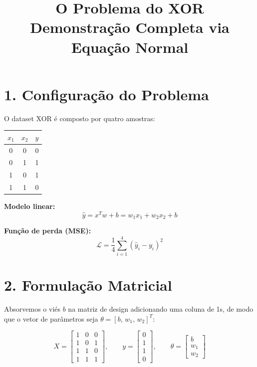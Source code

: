 \documentclass[12pt, a4paper]{article}
\title{
  \textbf{\textcolor{destaque}{O Problema do XOR}}\\[0.4em]
  \large Demonstração Completa via Equação Normal
}
\author{}
\date{}
\begin{document}
\maketitle
\thispagestyle{empty}

\section*{1. Configuração do Problema}

O dataset XOR é composto por quatro amostras:

\begin{center}
\begin{tabular}{ccc}
\toprule
$x_1$ & $x_2$ & $y$ \\
\midrule
0 & 0 & 0 \\
0 & 1 & 1 \\
1 & 0 & 1 \\
1 & 1 & 0 \\
\bottomrule
\end{tabular}
\end{center}

\medskip
\noindent\textbf{Modelo linear:}
\[
  \hat{y} = x^T w + b = w_1 x_1 + w_2 x_2 + b
\]

\noindent\textbf{Função de perda (MSE):}
\[
  \mathcal{L} = \frac{1}{4}\sum_{i=1}^{4}\left(\hat{y}_i - y_i\right)^2
\]

\section*{2. Formulação Matricial}

Absorvemos o viés $b$ na matriz de design adicionando uma coluna de 1s, de modo que o vetor de parâmetros seja $\theta = [b,\, w_1,\, w_2]^T$:

\[
  X = \begin{bmatrix}
    1 & 0 & 0 \\
    1 & 0 & 1 \\
    1 & 1 & 0 \\
    1 & 1 & 1
  \end{bmatrix},
  \qquad
  y = \begin{bmatrix} 0 \\ 1 \\ 1 \\ 0 \end{bmatrix},
  \qquad
  \theta = \begin{bmatrix} b \\ w_1 \\ w_2 \end{bmatrix}
\]
\end{document}
